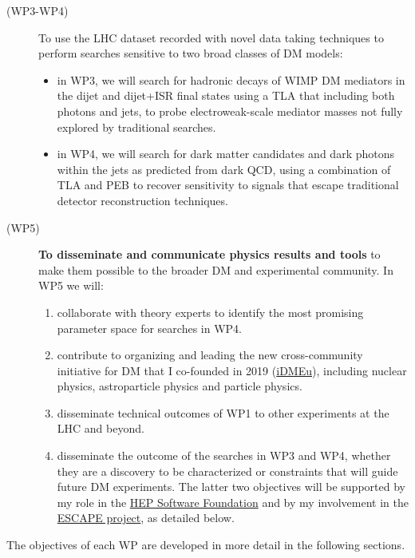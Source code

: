 \begin{description}
\item[(WP3-WP4)] To use the LHC dataset recorded with novel data taking techniques to perform searches sensitive to two broad classes of DM models:
 
\begin{itemize} 
\item in WP3, we will search for hadronic decays of WIMP DM mediators in the dijet and dijet+ISR final states using a TLA that including both photons and jets, to probe electroweak-scale mediator masses not fully explored by traditional searches.
\item in WP4, we will search for dark matter candidates and dark photons within the jets as predicted from dark QCD, using a combination of TLA and PEB to recover sensitivity to signals that escape traditional detector reconstruction techniques.
\end{itemize}

\item[(WP5)] \textbf{To disseminate and communicate physics results and tools} to make them possible to the broader DM and experimental community. In WP5 we will: 

\begin{enumerate} 
\item collaborate with theory experts to identify the most promising parameter space for searches in WP4. 
\item contribute to organizing and leading the new cross-community initiative for DM that I co-founded in 2019 (\href{https://indico.cern.ch/e/iDMEu/}{iDMEu}), including nuclear physics, astroparticle physics and particle physics.
\item disseminate technical outcomes of WP1 to other experiments at the LHC and beyond. 
\item disseminate the outcome of the searches in WP3 and WP4, whether they are a discovery to be characterized or constraints that will guide future DM experiments. The latter two objectives will be supported by my role in the \href{https://hepsoftwarefoundation.org}{HEP Software Foundation} and by my involvement in the \href{https://projectescape.eu}{ESCAPE project}, as detailed below. 
\end{enumerate} 

\end{description}

The objectives of each WP are developed in more detail in the following sections. 


